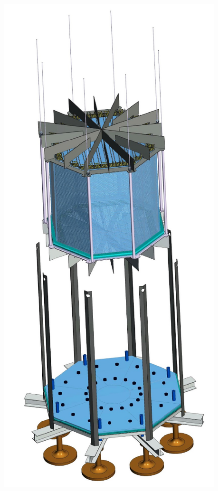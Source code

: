 \begin{figure}[!t]
\includegraphics[height=0.75\textheight]{./Figures/Veto-Assembly.pdf}

\end{figure}
